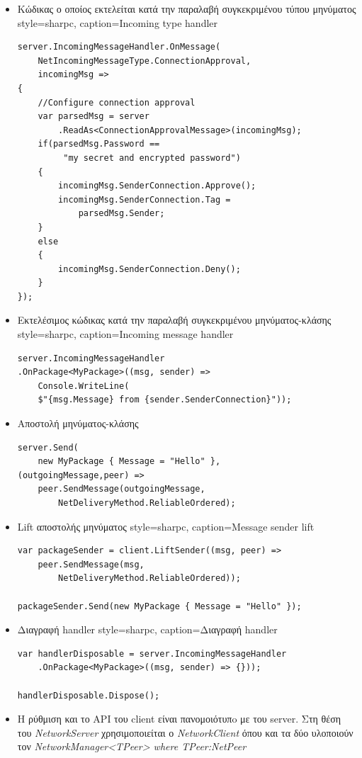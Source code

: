 \begin{itemize}
		\item Κώδικας ο οποίος εκτελείται κατά την παραλαβή συγκεκριμένου τύπου μηνύματος
	\lstset
	{
		style=sharpc, 
		caption={Incoming type handler}
	}
		\begin{lstlisting}
server.IncomingMessageHandler.OnMessage(
	NetIncomingMessageType.ConnectionApproval, 
	incomingMsg =>
{
	//Configure connection approval
	var parsedMsg = server
		.ReadAs<ConnectionApprovalMessage>(incomingMsg);
	if(parsedMsg.Password ==
		 "my secret and encrypted password")
	{
		incomingMsg.SenderConnection.Approve();
		incomingMsg.SenderConnection.Tag = 
			parsedMsg.Sender;
	}
	else
	{
		incomingMsg.SenderConnection.Deny();
	}
});
		\end{lstlisting}
		\item Εκτελέσιμος κώδικας κατά την παραλαβή συγκεκριμένου μηνύματος-κλάσης
	\lstset
	{
		style=sharpc, 
		caption={Incoming message handler}
	}
		\begin{lstlisting}
server.IncomingMessageHandler
.OnPackage<MyPackage>((msg, sender) => 
	Console.WriteLine(
	$"{msg.Message} from {sender.SenderConnection}"));
		\end{lstlisting}	
		\item Αποστολή μηνύματος-κλάσης
		\lstset{style=sharpc}
		\begin{lstlisting}
server.Send(
	new MyPackage { Message = "Hello" },
(outgoingMessage,peer) => 
	peer.SendMessage(outgoingMessage,
		NetDeliveryMethod.ReliableOrdered);
		\end{lstlisting}		
		\item Lift αποστολής μηνύματος
	\lstset
	{
		style=sharpc, 
		caption={Message sender lift}
	}
		\begin{lstlisting}
var packageSender = client.LiftSender((msg, peer) =>
	peer.SendMessage(msg, 
		NetDeliveryMethod.ReliableOrdered));
		
packageSender.Send(new MyPackage { Message = "Hello" });	
		\end{lstlisting}	
		\item Διαγραφή handler
	\lstset
	{
		style=sharpc, 
		caption={Διαγραφή handler}
	}
		\begin{lstlisting}	
var handlerDisposable = server.IncomingMessageHandler
	.OnPackage<MyPackage>((msg, sender) => {}));
		
handlerDisposable.Dispose();	
		\end{lstlisting}		
		\item Η ρύθμιση και το API του client είναι πανομοιότυπo με του server. Στη θέση του \textit{NetworkServer} χρησιμοποιείται ο \textit{NetworkClient} όπου και τα δύο υλοποιούν τον \textit{NetworkManager<TPeer> where TPeer:NetPeer}		
	\end{itemize}
	
